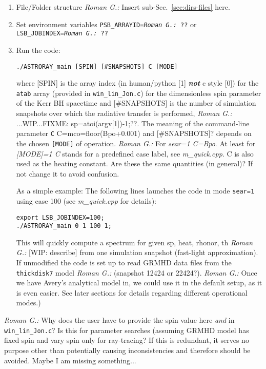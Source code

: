 \documentclass{emulateapj}
\newcommand{\rg}[1]{\color{blue}\textit{Roman G.:} #1\color{black}}
\begin{document}
\begin{enumerate}
  \item File/Folder structure
    \rg{Insert sub-Sec.~\ref{sec:dirs-files} here.}
  \item Set environment variables {\tt PSB\_ARRAYID=\rg{??}} or {\tt
    LSB\_JOBINDEX=\rg{??}}
  \item Run the code:
\begin{verbatim}
./ASTRORAY_main [SPIN] [#SNAPSHOTS] C [MODE]
\end{verbatim}
    where [SPIN] is the array index (in human/python [1] {\bf \it not} c style
    [0]) for the {\tt atab} array (provided in {\tt win\_lin\_Jon.c})
    for the dimensionless spin parameter of the Kerr BH spacetime and
    [\#SNAPSHOTS] is the number of simulation snapshots over which the
    radiative transfer is performed, \rg{...WIP...FIXME:
      sp=atoi(argv[1])-1;??}. The meaning of the command-line
    parameter {\tt C} C=mco=floor(Bpo+0.001) and [\#SNAPSHOTS]?
    depends on the chosen {\tt [MODE]} of operation. \rg{For
      \textit{sear=1 C=Bpo}. At least for \textit{[MODE]=1 C} stands
      for a predefined case label, see \textit{m\_quick.cpp}. C is
      also used as the heating constant. Are these the same quantities
      (in general)? If not change it to avoid confusion.}

    As a simple example: The following lines launches the code in mode
    {\tt sear=1} using case 100 (see \textit{m\_quick.cpp} for details):
\begin{verbatim}
export LSB_JOBINDEX=100; 
./ASTRORAY_main 0 1 100 1;
\end{verbatim}
    This will quickly compute a spectrum for given sp, heat, rhonor,
    th \rg{[WIP: describe]} from one simulation snapshot (fast-light
    approximation). If unmodified the code is set up to read GRMHD
    data files from the {\tt thickdisk7} model \rg{(snapshot 12424 or
      22424?)}. \rg{Once we have Avery's analytical model in, we could
      use it in the default setup, as it is even easier}. See later
    sections for details regarding different operational modes.)
\end{enumerate}
\rg{Why does the user have to provide the spin value here \emph{and}
  in {\tt win\_lin\_Jon.c}? Is this for parameter searches (assuming
  GRMHD model has fixed spin and vary spin only for ray-tracing? If
  this is redundant, it serves no purpose other than potentially
  causing inconsistencies and therefore should be avoided. Maybe I am
  missing something...}
\end{document}
